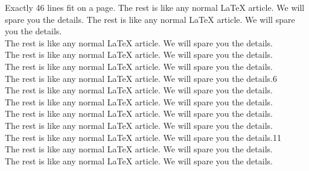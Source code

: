 \documentclass[submission,copyright,creativecommons]{eptcs}
\begin{document}
Exactly 46 lines fit on a page.
The rest is like any normal {\LaTeX} article.
We will spare you the details.
The rest is like any normal {\LaTeX} article.
We will spare you the details.\\
The rest is like any normal {\LaTeX} article.
We will spare you the details.\\
The rest is like any normal {\LaTeX} article.
We will spare you the details.\\
The rest is like any normal {\LaTeX} article.
We will spare you the details.\\
The rest is like any normal {\LaTeX} article.
We will spare you the details.\hfill6\\
The rest is like any normal {\LaTeX} article.
We will spare you the details.\\
The rest is like any normal {\LaTeX} article.
We will spare you the details.\\
The rest is like any normal {\LaTeX} article.
We will spare you the details.\\
The rest is like any normal {\LaTeX} article.
We will spare you the details.\\
The rest is like any normal {\LaTeX} article.
We will spare you the details.\hfill11\\
The rest is like any normal {\LaTeX} article.
We will spare you the details.\\
The rest is like any normal {\LaTeX} article.
We will spare you the details.
\end{document}
